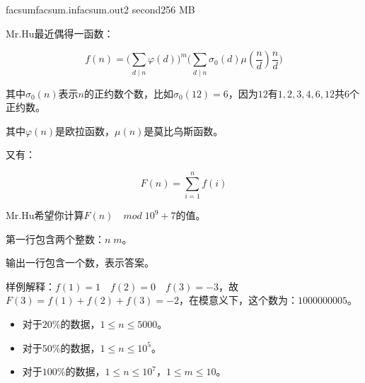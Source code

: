 \documentclass[11pt,a4paper,oneside]{article}
\begin{document}
\begin{problem}{facsum}{facsum.in}{facsum.out}{2 second}{256 MB}	
	
	Mr.Hu最近偶得一函数：
	
	$$
		f(n) = \big (\sum_{d \mid n} \varphi(d) \big )^m \big (\sum_{d \mid n} \sigma_0(d)\mu(\frac{n}{d})\frac{n}{d} \big)
	$$
	
	
	其中$\sigma_0(n)$表示$n$的正约数个数，比如$\sigma_0(12) = 6$，因为$12$有$1,2,3,4,6,12$共$6$个正约数。
	
	其中$\varphi(n)$是欧拉函数，$\mu(n)$是莫比乌斯函数。
	
	又有：
	
	$$
		F(n) = \sum_{i = 1}^{n} f(i)
	$$
	
	Mr.Hu希望你计算$F(n) \quad mod \; 10^9 + 7$的值。
	
	\InputFile
	
	第一行包含两个整数：$n \; m$。
	
	\OutputFile
	
	输出一行包含一个数，表示答案。

	\Example
	
	\begin{example}
	\end{example}
	
	样例解释：$f(1) = 1 \quad f(2) = 0 \quad f(3) = -3$，故$F(3) = f(1) + f(2) + f(3) = -2$，在模意义下，这个数为：$1000000005$。
	
	\Note
	
	\begin{itemize}
		\item 对于$20\%$的数据，$1 \leq n \leq 5000$。
		\item 对于$50\%$的数据，$1 \leq n \leq 10^5$。
		\item 对于$100\%$的数据，$1 \leq n \leq 10^7$，$1 \leq m \leq 10$。
	\end{itemize}

\end{problem}
\end{document}
